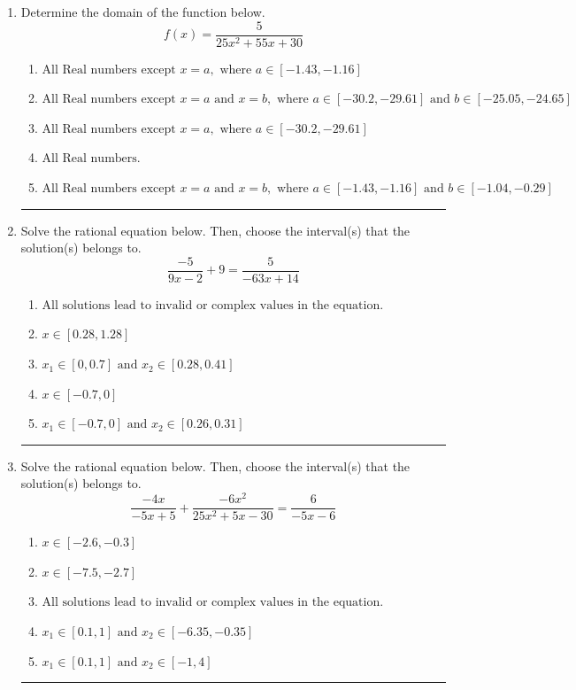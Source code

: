 \documentclass[14pt]{extbook}
\newcommand{\litem}[1]{\item#1\hspace*{-1cm}\rule{\textwidth}{0.4pt}}
\begin{document}
\begin{enumerate}
\litem{
Determine the domain of the function below.\[ f(x) = \frac{5}{25x^{2} +55 x + 30} \]\begin{enumerate}[label=\Alph*.]
\item \( \text{All Real numbers except } x = a, \text{ where } a \in [-1.43, -1.16] \)
\item \( \text{All Real numbers except } x = a \text{ and } x = b, \text{ where } a \in [-30.2, -29.61] \text{ and } b \in [-25.05, -24.65] \)
\item \( \text{All Real numbers except } x = a, \text{ where } a \in [-30.2, -29.61] \)
\item \( \text{All Real numbers.} \)
\item \( \text{All Real numbers except } x = a \text{ and } x = b, \text{ where } a \in [-1.43, -1.16] \text{ and } b \in [-1.04, -0.29] \)

\end{enumerate} }
\litem{
Solve the rational equation below. Then, choose the interval(s) that the solution(s) belongs to.\[ \frac{-5}{9x -2} + 9 = \frac{5}{-63x + 14} \]\begin{enumerate}[label=\Alph*.]
\item \( \text{All solutions lead to invalid or complex values in the equation.} \)
\item \( x \in [0.28,1.28] \)
\item \( x_1 \in [0, 0.7] \text{ and } x_2 \in [0.28,0.41] \)
\item \( x \in [-0.7,0] \)
\item \( x_1 \in [-0.7, 0] \text{ and } x_2 \in [0.26,0.31] \)

\end{enumerate} }
\litem{
Solve the rational equation below. Then, choose the interval(s) that the solution(s) belongs to.\[ \frac{-4x}{-5x + 5} + \frac{-6x^{2}}{25x^{2} +5 x -30} = \frac{6}{-5x -6} \]\begin{enumerate}[label=\Alph*.]
\item \( x \in [-2.6,-0.3] \)
\item \( x \in [-7.5,-2.7] \)
\item \( \text{All solutions lead to invalid or complex values in the equation.} \)
\item \( x_1 \in [0.1, 1] \text{ and } x_2 \in [-6.35,-0.35] \)
\item \( x_1 \in [0.1, 1] \text{ and } x_2 \in [-1,4] \)


\end{enumerate}}
\end{enumerate}
\end{document}
